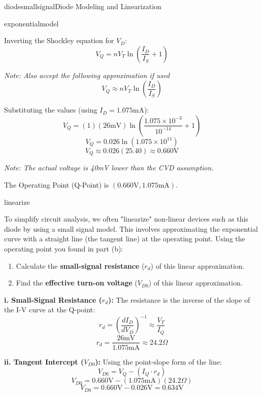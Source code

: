 \begin{mainquestion}{diodesmallsignal}{Diode Modeling and Linearization}
\begin{partquestion}{exponentialmodel}
\begin{answer}[2in]
        Inverting the Shockley equation for $V_D$:
        \[ V_Q = n V_T \ln\left(\frac{I_{D}}{I_S} + 1\right) \]
        
        \textit{Note: Also accept the following approximation if used} \[ V_Q \approx n V_T \ln\left(\frac{I_{D}}{I_S}\right) \]
        
        Substituting the values (using $I_D = 1.075\text{mA}$):
        \[ V_Q = (1)(26\text{mV}) \ln\left(\frac{1.075\times 10^{-3}}{10^{-14}} + 1\right) \]
        \[ V_Q = 0.026 \ln(1.075 \times 10^{11}) \]
        \[ V_Q \approx 0.026 (25.40) \approx 0.660\text{V} \]
        
        \textit{Note: The actual voltage is 40mV lower than the CVD assumption.}
        
        The Operating Point (Q-Point) is $(0.660\text{V}, 1.075\text{mA})$.
\end{answer}

\qnewpage
\end{partquestion}

\begin{partquestion}{linearize}
{To simplify circuit analysis, we often "linearize" non-linear devices such as this diode by using a small signal model. This involves approximating the exponential curve with a straight line (the tangent line) at the operating point. Using the operating point you found in part (b):
    \begin{enumerate}[label=(\roman*)]
        \item Calculate the \textbf{small-signal resistance} ($r_d$) of this linear approximation.
        \item Find the \textbf{effective turn-on voltage} ($V_{D0}$) of this linear approximation.
    \end{enumerate}}

\begin{answer}[2.5in]
        \textbf{i. Small-Signal Resistance ($r_d$):}
        The resistance is the inverse of the slope of the I-V curve at the Q-point:
        \[ r_d = \left( \frac{dI_D}{dV_D} \right)^{-1} \approx \frac{V_T}{I_Q} \]
        \[ r_d = \frac{26\text{mV}}{1.075\text{mA}} \approx 24.2\Omega \]
        
        \textbf{ii. Tangent Intercept ($V_{D0}$):}
        Using the point-slope form of the line:
        \[ V_{D0} = V_Q - (I_Q \cdot r_d) \]
        \[ V_{D0} = 0.660\text{V} - (1.075\text{mA})(24.2\Omega) \]
        \[ V_{D0} = 0.660\text{V} - 0.026\text{V} = 0.634\text{V} \]
\end{answer}


\end{partquestion}
\end{mainquestion}

